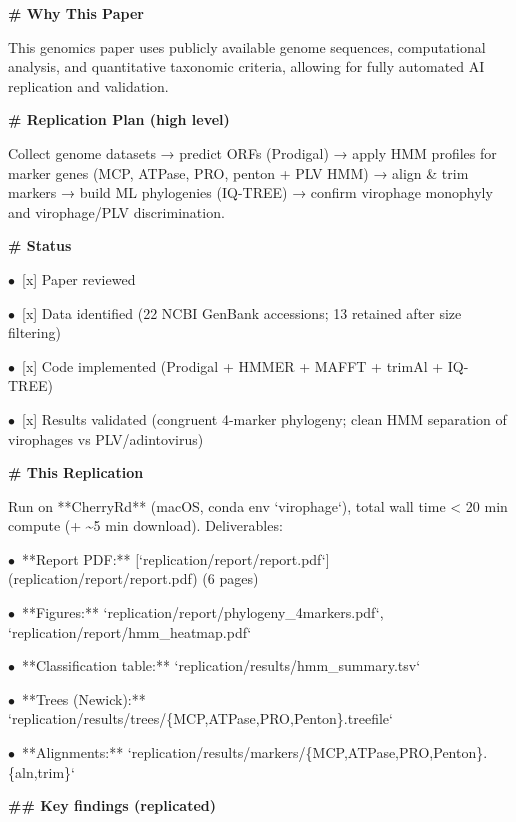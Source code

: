 \documentclass[11pt]{article}
\begin{document}
\par\medskip\textbf{\# Why This Paper}\par
This genomics paper uses publicly available genome sequences, computational analysis, and quantitative taxonomic criteria, allowing for fully automated AI replication and validation.

\par\medskip\textbf{\# Replication Plan (high level)}\par
Collect genome datasets → predict ORFs (Prodigal) → apply HMM profiles for marker genes (MCP, ATPase, PRO, penton + PLV HMM) → align \& trim markers → build ML phylogenies (IQ-TREE) → confirm virophage monophyly and virophage/PLV discrimination.

\par\medskip\textbf{\# Status}\par
\par$\bullet$\ [x] Paper reviewed
\par$\bullet$\ [x] Data identified (22 NCBI GenBank accessions; 13 retained after size filtering)
\par$\bullet$\ [x] Code implemented (Prodigal + HMMER + MAFFT + trimAl + IQ-TREE)
\par$\bullet$\ [x] Results validated (congruent 4-marker phylogeny; clean HMM separation of virophages vs PLV/adintovirus)

\par\medskip\textbf{\# This Replication}\par

Run on **CherryRd** (macOS, conda env `virophage`), total wall time \textless{} 20 min compute
(+ \textasciitilde{}5 min download). Deliverables:
\par$\bullet$\ **Report PDF:** [`replication/report/report.pdf`](replication/report/report.pdf) (6 pages)
\par$\bullet$\ **Figures:** `replication/report/phylogeny\_4markers.pdf`, `replication/report/hmm\_heatmap.pdf`
\par$\bullet$\ **Classification table:** `replication/results/hmm\_summary.tsv`
\par$\bullet$\ **Trees (Newick):** `replication/results/trees/\{MCP,ATPase,PRO,Penton\}.treefile`
\par$\bullet$\ **Alignments:** `replication/results/markers/\{MCP,ATPase,PRO,Penton\}.\{aln,trim\}`

\par\medskip\textbf{\#\# Key findings (replicated)}\par
\end{document}
